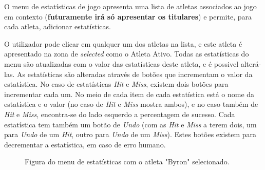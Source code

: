 O menu de estatísticas de jogo apresenta uma lista de atletas associados ao jogo em contexto (\textbf{futuramente irá só apresentar os titulares}) e permite, para cada atleta, adicionar estatísticas. 

O utilizador pode clicar em qualquer um dos atletas na lista, e este atleta é apresentado na zona de \textit{selected} como o Atleta Ativo. Todas as estatísticas do menu são atualizadas com o valor das estatísticas deste atleta, e é possivel alterá-las. As estatísticas são alteradas através de botões que incrementam o valor da estatística. No caso de estatísticas \textit{Hit} e \textit{Miss}, existem dois botões para incrementar cada um. No meio de cada item de cada estatística está o nome da estatística e o valor (no caso de \textit{Hit} e \textit{Miss} mostra ambos), e no caso também de \textit{Hit} e \textit{Miss}, encontra-se do lado esquerdo a percentagem de sucesso. Cada estatística tem também um botão de \textit{Undo} (com as \textit{Hit} e \textit{Miss} a terem dois, um para \textit{Undo} de um \textit{Hit}, outro para \textit{Undo} de um \textit{Miss}). Estes botões existem para decrementar a estatística, em caso de erro humano.
\newpage

\begin{figure}[h]
	\begin{center}
	\end{center}
	\caption{Figura do menu de estatísticas com o atleta "Byron" selecionado.}\label{fig:gamestatslist2}
\end{figure}

